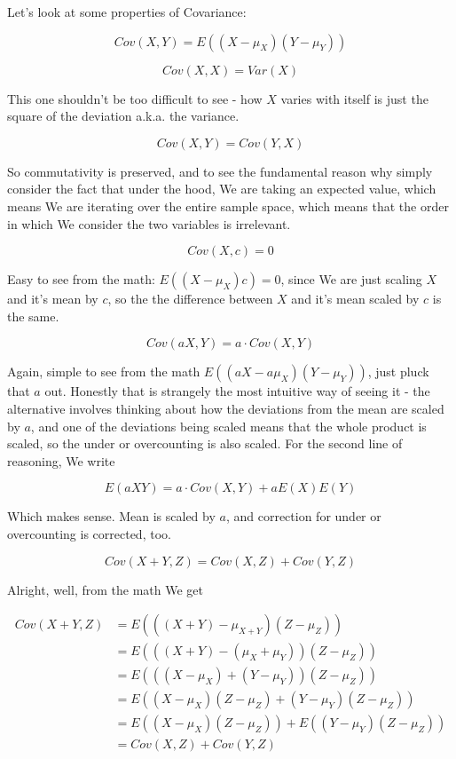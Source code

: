 \documentclass{article}
\begin{document}
		Let's look at some properties of Covariance:
		
		\[ Cov(X, Y) = E((X-\mu_X)(Y-\mu_Y)) \]	
		
		\[ Cov(X, X) = Var(X) \]
		
		This one shouldn't be too difficult to see - how $X$ varies with itself is just the square of the deviation a.k.a. the variance.
		
		\[ Cov(X, Y) = Cov(Y, X) \]	
		
		So commutativity is preserved, and to see the fundamental reason why simply consider the fact that under the hood, We are taking an expected value, which means We are iterating over the entire sample space, which means that the order in which We consider the two variables is irrelevant.
		
		\[ Cov(X, c) = 0 \]		
		
		Easy to see from the math: $E((X-\mu_X)c) = 0$, since We are just scaling $X$ and it's mean by $c$, so the the difference between $X$ and it's mean scaled by $c$ is the same.
		
		\[ Cov(aX, Y) = a\cdot Cov(X, Y) \]
		
		Again, simple to see from the math $E((aX - a\mu_X)(Y-\mu_Y))$, just pluck that $a$ out. Honestly that is strangely the most intuitive way of seeing it - the alternative involves thinking about how the deviations from the mean are scaled by $a$, and one of the deviations being scaled means that the whole product is scaled, so the under or overcounting is also scaled. For the second line of reasoning, We write
		
		\[ E(aXY) = a\cdot Cov(X, Y) + aE(X)E(Y) \]
		
		Which makes sense. Mean is scaled by $a$, and correction for under or overcounting is corrected, too.
		
		\[ Cov(X+Y, Z) = Cov(X, Z) + Cov(Y, Z) \]	
			
		Alright, well, from the math We get

		\begin{align*}
		 	Cov(X+Y, Z) &= E(((X+Y)-\mu_{X+Y})(Z - \mu_Z)) 	\\
		 	&= E(((X+Y)-(\mu_X+\mu_Y))(Z - \mu_Z)) 	\\
		 	&= E(((X-\mu_X)+(Y-\mu_Y))(Z - \mu_Z)) 	\\
		 	&= E((X-\mu_X)(Z - \mu_Z)+(Y-\mu_Y)(Z - \mu_Z)) 	\\
		 	&= E((X-\mu_X)(Z - \mu_Z))+E((Y-\mu_Y)(Z - \mu_Z)) \\
		 	&= Cov(X, Z) + Cov(Y, Z) 	
		\end{align*}
			
\end{document}
